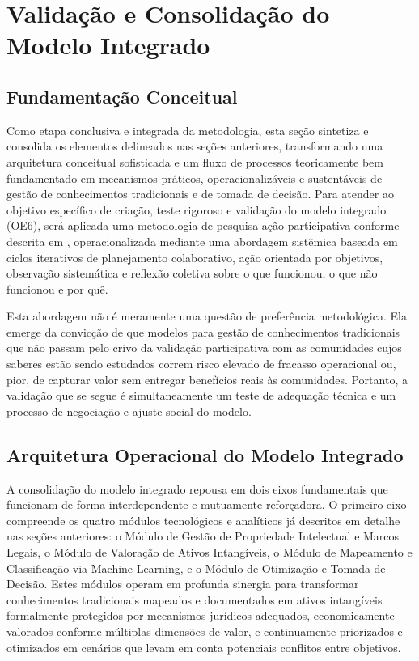 \section{Validação e Consolidação do Modelo Integrado}

\subsection{Fundamentação Conceitual}

Como etapa conclusiva e integrada da metodologia, esta seção sintetiza e consolida os elementos delineados nas seções anteriores, transformando uma arquitetura conceitual sofisticada e um fluxo de processos teoricamente bem fundamentado em mecanismos práticos, operacionalizáveis e sustentáveis de gestão de conhecimentos tradicionais e de tomada de decisão. Para atender ao objetivo específico de criação, teste rigoroso e validação do modelo integrado (OE6), será aplicada uma metodologia de pesquisa-ação participativa conforme descrita em \cite{Tidd2005}, operacionalizada mediante uma abordagem sistêmica baseada em ciclos iterativos de planejamento colaborativo, ação orientada por objetivos, observação sistemática e reflexão coletiva sobre o que funcionou, o que não funcionou e por quê.

Esta abordagem não é meramente uma questão de preferência metodológica. Ela emerge da convicção de que modelos para gestão de conhecimentos tradicionais que não passam pelo crivo da validação participativa com as comunidades cujos saberes estão sendo estudados correm risco elevado de fracasso operacional ou, pior, de capturar valor sem entregar benefícios reais às comunidades. Portanto, a validação que se segue é simultaneamente um teste de adequação técnica e um processo de negociação e ajuste social do modelo.

\subsection{Arquitetura Operacional do Modelo Integrado} 

A consolidação do modelo integrado repousa em dois eixos fundamentais que funcionam de forma interdependente e mutuamente reforçadora. O primeiro eixo compreende os quatro módulos tecnológicos e analíticos já descritos em detalhe nas seções anteriores: o Módulo de Gestão de Propriedade Intelectual e Marcos Legais, o Módulo de Valoração de Ativos Intangíveis, o Módulo de Mapeamento e Classificação via Machine Learning, e o Módulo de Otimização e Tomada de Decisão. Estes módulos operam em profunda sinergia para transformar conhecimentos tradicionais mapeados e documentados em ativos intangíveis formalmente protegidos por mecanismos jurídicos adequados, economicamente valorados conforme múltiplas dimensões de valor, e continuamente priorizados e otimizados em cenários que levam em conta potenciais conflitos entre objetivos.

